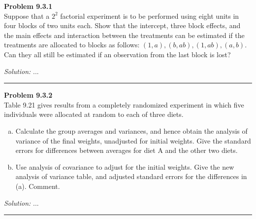 \documentclass[a4paper, 11pt]{article}
\newenvironment{problem}[2][Problem]
    { \begin{mdframed}[backgroundcolor=gray!20] \textbf{#1 #2} \\}
    {  \end{mdframed}}
\newenvironment{solution}
    {\textit{Solution:}}
    {}
\begin{document}
\begin{problem}{9.3.1}
Suppose that a $2^{2}$ factorial experiment is to be performed using eight units in four blocks of two units each. Show that the intercept, three block effects, and the main effects and interaction between the treatments can be estimated if the treatments are allocated to blocks as follows: $(1, a),(b, a b),(1, a b),(a, b) .$ Can they all still be estimated if an observation from the last block is lost?
\end{problem}
\begin{solution}
...
\end{solution}

\noindent\rule{7in}{2.8pt}

\begin{problem}{9.3.2}
  Table 9.21 gives results from a completely randomized experiment in which five individuals were allocated at random to each of three diets.
  \begin{enumerate}[(a)]
    \item Calculate the group averages and variances, and hence obtain the analysis of variance of the final weights, unadjusted for initial weights. Give the standard errors for differences between averages for diet A and the other two diets.
    \item Use analysis of covariance to adjust for the initial weights. Give the new analysis of variance table, and adjusted standard errors for the differences in (a). Comment.
  \end{enumerate}
\end{problem}
\begin{solution}
...
\end{solution}

\noindent\rule{7in}{2.8pt}
\end{document}

